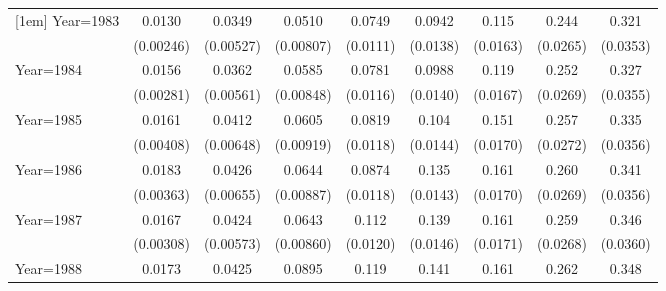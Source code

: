 \begin{table}[htbp]
\begin{tabular}{l*{8}{c}}
[1em]
Year=1983           &      0.0130\sym{***}&      0.0349\sym{***}&      0.0510\sym{***}&      0.0749\sym{***}&      0.0942\sym{***}&       0.115\sym{***}&       0.244\sym{***}&       0.321\sym{***}\\
                    &   (0.00246)         &   (0.00527)         &   (0.00807)         &    (0.0111)         &    (0.0138)         &    (0.0163)         &    (0.0265)         &    (0.0353)         \\
[1em]
Year=1984           &      0.0156\sym{***}&      0.0362\sym{***}&      0.0585\sym{***}&      0.0781\sym{***}&      0.0988\sym{***}&       0.119\sym{***}&       0.252\sym{***}&       0.327\sym{***}\\
                    &   (0.00281)         &   (0.00561)         &   (0.00848)         &    (0.0116)         &    (0.0140)         &    (0.0167)         &    (0.0269)         &    (0.0355)         \\
[1em]
Year=1985           &      0.0161\sym{***}&      0.0412\sym{***}&      0.0605\sym{***}&      0.0819\sym{***}&       0.104\sym{***}&       0.151\sym{***}&       0.257\sym{***}&       0.335\sym{***}\\
                    &   (0.00408)         &   (0.00648)         &   (0.00919)         &    (0.0118)         &    (0.0144)         &    (0.0170)         &    (0.0272)         &    (0.0356)         \\
[1em]
Year=1986           &      0.0183\sym{***}&      0.0426\sym{***}&      0.0644\sym{***}&      0.0874\sym{***}&       0.135\sym{***}&       0.161\sym{***}&       0.260\sym{***}&       0.341\sym{***}\\
                    &   (0.00363)         &   (0.00655)         &   (0.00887)         &    (0.0118)         &    (0.0143)         &    (0.0170)         &    (0.0269)         &    (0.0356)         \\
[1em]
Year=1987           &      0.0167\sym{***}&      0.0424\sym{***}&      0.0643\sym{***}&       0.112\sym{***}&       0.139\sym{***}&       0.161\sym{***}&       0.259\sym{***}&       0.346\sym{***}\\
                    &   (0.00308)         &   (0.00573)         &   (0.00860)         &    (0.0120)         &    (0.0146)         &    (0.0171)         &    (0.0268)         &    (0.0360)         \\
[1em]
Year=1988           &      0.0173\sym{***}&      0.0425\sym{***}&      0.0895\sym{***}&       0.119\sym{***}&       0.141\sym{***}&       0.161\sym{***}&       0.262\sym{***}&       0.348\sym{***}\\

\end{tabular}
\end{table}

